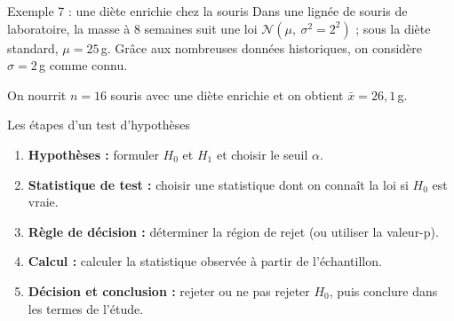 \documentclass{BeamerTemplate}
\begin{document}
\begin{frame}[t]{Exemple 7 : une diète enrichie chez la souris}
  Dans une lignée de souris de laboratoire, la masse à 8 semaines suit une loi $\mathcal{N}(\mu,\ \sigma^2 = 2^2)$ ; sous la diète standard, $\mu = 25$\,g.
  Grâce aux nombreuses données historiques, on considère $\sigma = 2$\,g comme \alert{connu}.

  \medskip
  On nourrit $n = 16$ souris avec une \alert{diète enrichie} et on obtient $\bar{x} = 26{,}1$\,g.

  \medskip

  \medskip

\end{frame}

\begin{frame}[t]{Les étapes d'un test d'hypothèses}
  \begin{enumerate}\itemsep 1.5mm
    \item<1-> \textbf{Hypothèses :} formuler $H_0$ et $H_1$ et choisir le \alert{seuil} $\alpha$.
    \item<2-> \textbf{Statistique de test :} choisir une statistique dont on connaît la \alert{loi si $H_0$ est vraie}.
    \item<3-> \textbf{Règle de décision :} déterminer la \alert{région de rejet} (ou utiliser la valeur-p).
    \item<4-> \textbf{Calcul :} calculer la statistique observée à partir de l'échantillon.
    \item<5-> \textbf{Décision et conclusion :} rejeter ou ne pas rejeter $H_0$, puis conclure \alert{dans les termes de l'étude}.
  \end{enumerate}

\end{frame}
\end{document}
